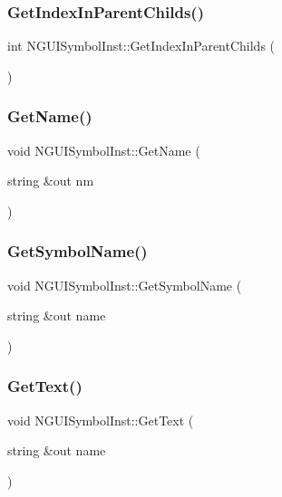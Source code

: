 \subsubsection{\texorpdfstring{Get\+Index\+In\+Parent\+Childs()}{GetIndexInParentChilds()}}
{\footnotesize\ttfamily int N\+G\+U\+I\+Symbol\+Inst\+::\+Get\+Index\+In\+Parent\+Childs (\begin{DoxyParamCaption}{ }\end{DoxyParamCaption})}

\hypertarget{class_n_g_u_i_symbol_inst_a2b8f5429f7852573e2d061e278b13dbe}{}\label{class_n_g_u_i_symbol_inst_a2b8f5429f7852573e2d061e278b13dbe} 
\subsubsection{\texorpdfstring{Get\+Name()}{GetName()}}
{\footnotesize\ttfamily void N\+G\+U\+I\+Symbol\+Inst\+::\+Get\+Name (\begin{DoxyParamCaption}\item[{string \&out}]{nm }\end{DoxyParamCaption})}

\hypertarget{class_n_g_u_i_symbol_inst_af80df6fadf5ad55885b65b749f66aa70}{}\label{class_n_g_u_i_symbol_inst_af80df6fadf5ad55885b65b749f66aa70} 
\subsubsection{\texorpdfstring{Get\+Symbol\+Name()}{GetSymbolName()}}
{\footnotesize\ttfamily void N\+G\+U\+I\+Symbol\+Inst\+::\+Get\+Symbol\+Name (\begin{DoxyParamCaption}\item[{string \&out}]{name }\end{DoxyParamCaption})}

\hypertarget{class_n_g_u_i_symbol_inst_af07351f2f8fc813cdfe400d94c265dde}{}\label{class_n_g_u_i_symbol_inst_af07351f2f8fc813cdfe400d94c265dde} 
\subsubsection{\texorpdfstring{Get\+Text()}{GetText()}}
{\footnotesize\ttfamily void N\+G\+U\+I\+Symbol\+Inst\+::\+Get\+Text (\begin{DoxyParamCaption}\item[{string \&out}]{name }\end{DoxyParamCaption})}

